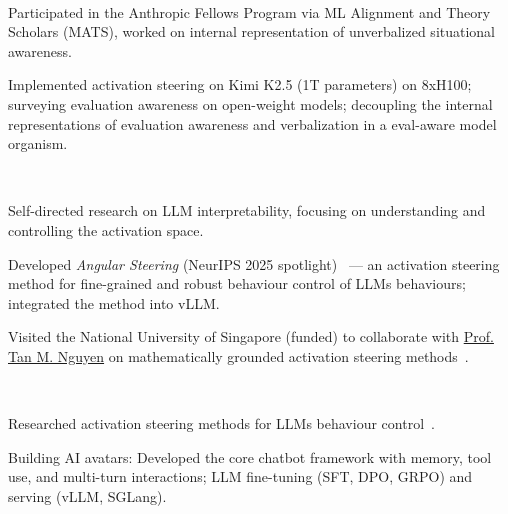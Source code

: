 \\
\begin{zitemize}
    \item Participated in the Anthropic Fellows Program via  ML Alignment and Theory
Scholars (MATS), worked on internal representation of unverbalized situational
awareness.
    \item Implemented activation steering on Kimi K2.5 (1T parameters) on 8xH100; surveying evaluation awareness on open-weight
models; decoupling the internal representations of evaluation awareness and verbalization in a
eval-aware model organism.
\end{zitemize}

\\
\vspace{-1em}
\begin{zitemize}
    \item Self-directed research on LLM interpretability, focusing on understanding and
    controlling the activation space.
\item Developed \textit{Angular Steering} (NeurIPS 2025 spotlight)~\cite{vu2025angular} --- an
activation steering method for fine-grained and robust behaviour control of LLMs
    behaviours; integrated the method into vLLM.
\item Visited the National University of Singapore (funded) to collaborate with
\href{https://scholar.google.com/citations?user=OizOh88AAAAJ&hl=en}{Prof. Tan M. Nguyen}
on
    mathematically grounded activation steering methods~\cite{nguyen2025activationsteeringfeedbackcontroller}.
\end{zitemize}

\\
\vspace{-.2em}
\begin{zitemize}
    \item Researched activation steering methods for LLMs behaviour control~\cite{vu2025angular}.
    \item Building AI avatars: Developed the core chatbot framework with memory, tool use, and multi-turn interactions;
    LLM fine-tuning (SFT, DPO, GRPO) and serving (vLLM, SGLang).
\end{zitemize}

